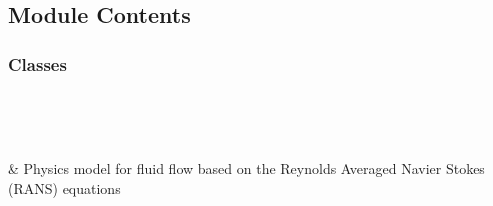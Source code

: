 \documentclass[letterpaper,10pt,english]{sphinxmanual}
\begin{document}
\section{}
\label{\detokenize{autoapi/NavierStokes/index:module-NavierStokes}}\label{\detokenize{autoapi/NavierStokes/index:navierstokes}}\label{\detokenize{autoapi/NavierStokes/index::doc}}

\subsection{Module Contents}
\label{\detokenize{autoapi/NavierStokes/index:module-contents}}

\subsubsection{Classes}
\label{\detokenize{autoapi/NavierStokes/index:classes}}

\begin{savenotes}\sphinxatlongtablestart\begin{longtable}[c]{}
\hline

\endfirsthead

%
{}\\
\hline

\endhead

\hline
{}\\
\endfoot

\endlastfoot

\sphinxAtStartPar
{\hyperref[\detokenize{autoapi/NavierStokes/index:NavierStokes.NavierStokes}]{}}
&
\sphinxAtStartPar
Physics model for fluid flow based on the Reynolds Averaged Navier Stokes (RANS) equations
\\
\hline
\end{longtable}\sphinxatlongtableend\end{savenotes}
\end{document}
